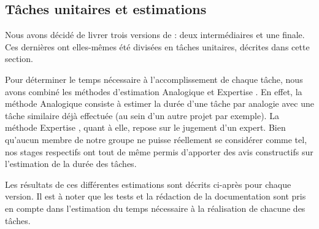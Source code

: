     \subsection{Tâches unitaires et estimations}
    \label{subsec:taches_unitaires}

        Nous avons décidé de livrer trois versions de \glasir{} : deux intermédiaires et une finale. Ces dernières ont elles-mêmes été divisées en tâches unitaires, décrites dans cette section.
        
        Pour déterminer le temps nécessaire à l'accomplissement de chaque tâche, nous avons combiné les méthodes d’estimation \og Analogique \fg{} et \og Expertise \fg{}. En effet, la méthode \og Analogique \fg{} consiste à estimer la durée d'une tâche par analogie avec une tâche similaire déjà effectuée (au sein d'un autre projet par exemple). La méthode \og Expertise \fg{}, quant à elle, repose sur le jugement d'un expert. Bien qu'aucun membre de notre groupe ne puisse réellement se considérer comme tel, nos stages respectifs ont tout de même permis d'apporter des avis constructifs sur l'estimation de la durée des tâches.
        
        Les résultats de ces différentes estimations sont décrits ci-après pour chaque version. Il est à noter que les tests et la rédaction de la documentation sont pris en compte dans l'estimation du temps nécessaire à la réalisation de chacune des tâches.
        

